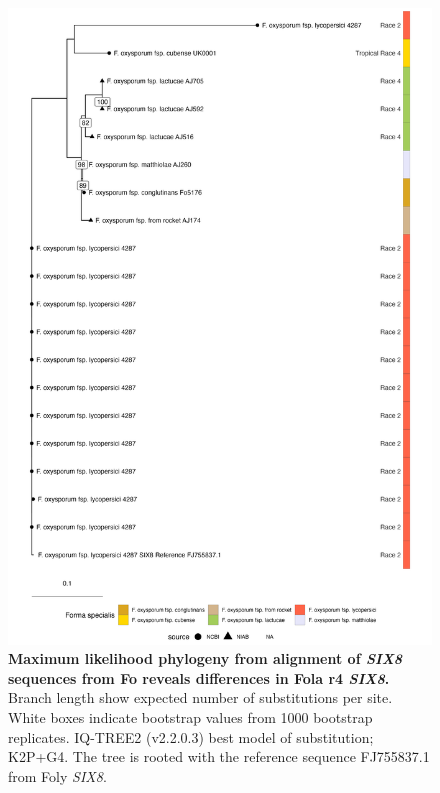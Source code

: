 \begin{figure}[htp!]
    \centering
    \includegraphics[width=13cm]{Figures/lactucaeSIX8tree.png}
    \captionsetup{width=\textwidth}
    \caption[Maximum likelihood phylogeny from alignment of \textit{SIX8} sequences from \acl{Fo} reveals differences in \acl{Fola} \acl{r4} \textit{SIX8}.]{\textbf{Maximum likelihood phylogeny from alignment of \textit{SIX8} sequences from \acf{Fo} reveals differences in \acf{Fola} \acf{r4} \textit{SIX8}.}  Branch length show expected number of substitutions per site. White boxes indicate bootstrap values from 1000 bootstrap replicates. IQ-TREE2 (v2.2.0.3) best model of substitution; K2P+G4. The tree is rooted with the reference sequence FJ755837.1 from \ac{Foly} \textit{SIX8}.}
    \label{fig:lactucae-six8}
\end{figure}

